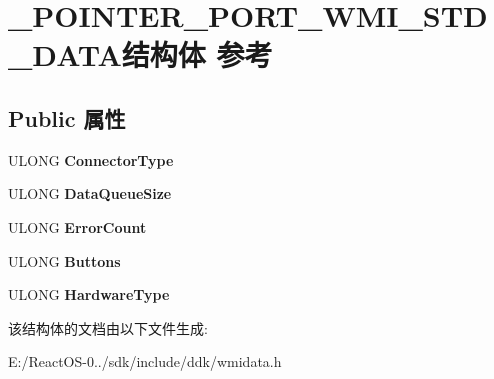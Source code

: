 \hypertarget{struct___p_o_i_n_t_e_r___p_o_r_t___w_m_i___s_t_d___d_a_t_a}{}\section{\+\_\+\+P\+O\+I\+N\+T\+E\+R\+\_\+\+P\+O\+R\+T\+\_\+\+W\+M\+I\+\_\+\+S\+T\+D\+\_\+\+D\+A\+T\+A结构体 参考}
\label{struct___p_o_i_n_t_e_r___p_o_r_t___w_m_i___s_t_d___d_a_t_a}
\subsection*{Public 属性}
\begin{DoxyCompactItemize}
\item 
\mbox{\label{struct___p_o_i_n_t_e_r___p_o_r_t___w_m_i___s_t_d___d_a_t_a_af1c80dfa4f7149d98e7392331b2245b2}} 
U\+L\+O\+NG {\bfseries Connector\+Type}
\item 
\mbox{\label{struct___p_o_i_n_t_e_r___p_o_r_t___w_m_i___s_t_d___d_a_t_a_ab441d0208f1a8496659de451af2851be}} 
U\+L\+O\+NG {\bfseries Data\+Queue\+Size}
\item 
\mbox{\label{struct___p_o_i_n_t_e_r___p_o_r_t___w_m_i___s_t_d___d_a_t_a_abce6cd5595a9198af8330a5071ff8242}} 
U\+L\+O\+NG {\bfseries Error\+Count}
\item 
\mbox{\label{struct___p_o_i_n_t_e_r___p_o_r_t___w_m_i___s_t_d___d_a_t_a_afd9d979e0a766fb1c60939ccc57e652a}} 
U\+L\+O\+NG {\bfseries Buttons}
\item 
\mbox{\label{struct___p_o_i_n_t_e_r___p_o_r_t___w_m_i___s_t_d___d_a_t_a_a230cf58b5201218e1623b012fceada16}} 
U\+L\+O\+NG {\bfseries Hardware\+Type}
\end{DoxyCompactItemize}


该结构体的文档由以下文件生成\+:\begin{DoxyCompactItemize}
\item 
E\+:/\+React\+O\+S-\/0../sdk/include/ddk/wmidata.\+h\end{DoxyCompactItemize}
